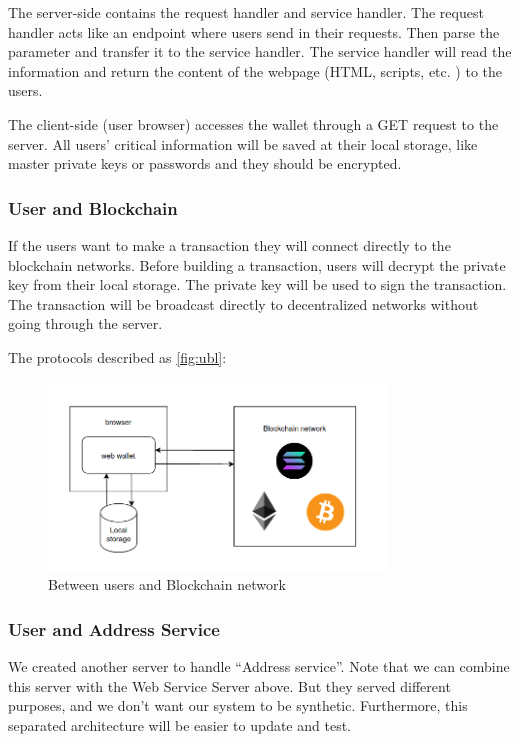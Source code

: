 The server-side contains the request handler and service handler. The request handler acts like an endpoint where users send in their requests. Then parse the parameter and transfer it to the service handler. The service handler will read the information and return the content of the webpage (HTML, scripts, etc. ) to the users.

The client-side (user browser) accesses the wallet through a GET request to the server. All users' critical information will be saved at their local storage, like master private keys or passwords and they should be encrypted.

\subsubsection{User and Blockchain}

If the users want to make a transaction they will connect directly to the blockchain networks. Before building a transaction, users will decrypt the private key from their local storage. The private key will be used to sign the transaction. The transaction will be broadcast directly to decentralized networks without going through the server.

The protocols described as \autoref{fig:ubl}:

\begin{figure}[!ht]
    \centering
    \includegraphics[width=0.8\textwidth]{images/design_ubl.png}
    \caption[Between users and Blockchain network]{Between users and Blockchain network}
    \label{fig:ubl}
\end{figure}

\subsubsection{User and Address Service}

We created another server to handle “Address service”. Note that we can combine this server with the Web Service Server above. But they served different purposes, and we don’t want our system to be synthetic. Furthermore, this separated architecture will be easier to update and test.

